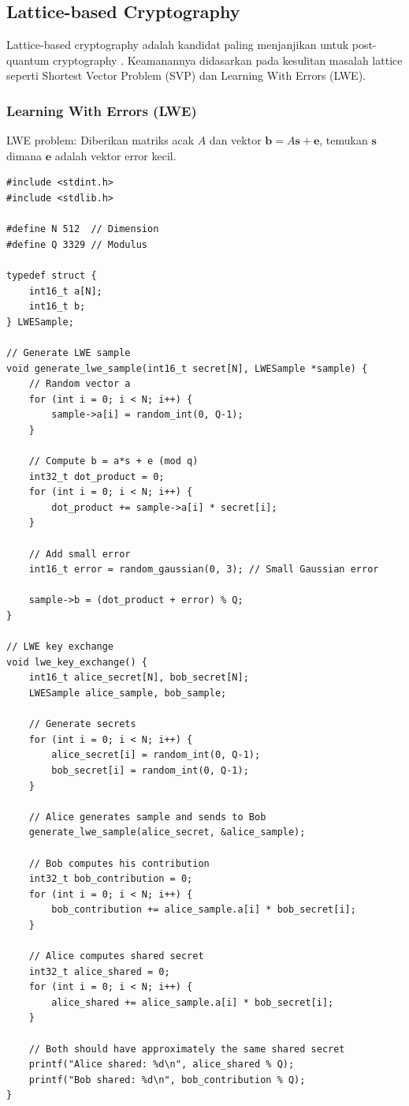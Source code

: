 \subsection{Lattice-based Cryptography}

Lattice-based cryptography adalah kandidat paling menjanjikan untuk post-quantum cryptography \cite{regev2009}. Keamanannya didasarkan pada kesulitan masalah lattice seperti Shortest Vector Problem (SVP) dan Learning With Errors (LWE).

\subsubsection{Learning With Errors (LWE)}

LWE problem: Diberikan matriks acak $A$ dan vektor $\mathbf{b} = A\mathbf{s} + \mathbf{e}$, temukan $\mathbf{s}$ dimana $\mathbf{e}$ adalah vektor error kecil.

\begin{lstlisting}[style=cstyle, caption={LWE Key Exchange}]
#include <stdint.h>
#include <stdlib.h>

#define N 512  // Dimension
#define Q 3329 // Modulus

typedef struct {
    int16_t a[N];
    int16_t b;
} LWESample;

// Generate LWE sample
void generate_lwe_sample(int16_t secret[N], LWESample *sample) {
    // Random vector a
    for (int i = 0; i < N; i++) {
        sample->a[i] = random_int(0, Q-1);
    }
    
    // Compute b = a*s + e (mod q)
    int32_t dot_product = 0;
    for (int i = 0; i < N; i++) {
        dot_product += sample->a[i] * secret[i];
    }
    
    // Add small error
    int16_t error = random_gaussian(0, 3); // Small Gaussian error
    
    sample->b = (dot_product + error) % Q;
}

// LWE key exchange
void lwe_key_exchange() {
    int16_t alice_secret[N], bob_secret[N];
    LWESample alice_sample, bob_sample;
    
    // Generate secrets
    for (int i = 0; i < N; i++) {
        alice_secret[i] = random_int(0, Q-1);
        bob_secret[i] = random_int(0, Q-1);
    }
    
    // Alice generates sample and sends to Bob
    generate_lwe_sample(alice_secret, &alice_sample);
    
    // Bob computes his contribution
    int32_t bob_contribution = 0;
    for (int i = 0; i < N; i++) {
        bob_contribution += alice_sample.a[i] * bob_secret[i];
    }
    
    // Alice computes shared secret
    int32_t alice_shared = 0;
    for (int i = 0; i < N; i++) {
        alice_shared += alice_sample.a[i] * bob_secret[i];
    }
    
    // Both should have approximately the same shared secret
    printf("Alice shared: %d\n", alice_shared % Q);
    printf("Bob shared: %d\n", bob_contribution % Q);
}
\end{lstlisting}

